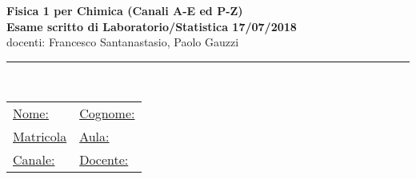 \documentclass[10pt,a4paper,fleqn]{article}
\begin{document}
\pagestyle{empty}

%
%
\newsavebox{\savepar}
\newenvironment{boxit}{\begin{lrbox}{\savepar}
\begin{minipage}[b]{16.0cm}}
{\end{minipage}\end{lrbox}\fbox{\usebox{\savepar}}}
\newcommand{\myblist}[1]{\begin{list}{#1}{\setlength{\topsep}{1.8mm}
\setlength{\parskip}{0mm} \setlength{\partopsep}{0mm} \setlength{\parsep}{0mm}
\setlength{\itemsep}{0mm}}}
\newcommand{\myhfill}[1]{\hfill {\it #1} = \underline{$~~~~~~~~~~~~~~~~~~~~~~~~~~~$}}
\newcommand{\myhfiyn}[0]{\hfill $\Box$~{\sc si}~~~~~~~~$\Box$~{\sc no}}
\newcommand{\myhfild}[2]
{\hfill {\it #1}= \underline{$~~~~~~~~~~$};~ {\it #2}= \underline{$~~~~~~~~~~$}}
\newcommand{\myhfilt}[3]
{\hfill {\it #1}= \underline{$~~~~~~~~~~~~~$};~ 
{\it #2}= \underline{$~~~~~~~~~~~~~$};~{\it #3}= \underline{$~~~~~~~~~~~~~$}}
%

\setlength{\unitlength}{1mm} 
\setlength{\headheight}{0mm} %

\newcommand{\s}{\text{s}}
\newcommand{\km}{\text{km}}
\newcommand{\kg}{\text{kg}}


\vspace*{-3.5cm}
\Large
{
\begin{center}
\vspace{0.1cm}
{\bf  Fisica 1 per Chimica (Canali A-E ed P-Z)} \\
{\bf Esame scritto di Laboratorio/Statistica 17/07/2018}   \\
docenti: Francesco Santanastasio, Paolo Gauzzi
   \\
\end{center}
\noindent\rule{18cm}{0.4pt}  \\
\normalsize
%
\begin{tabular}{ll}
{\underline{Nome:}}  \hspace{6cm} & {\underline{Cognome:}} \\[0.35cm]
{\underline {Matricola}} & {\underline {Aula:}}  \\[0.35cm]
{\underline {Canale:}} & {\underline {Docente:}}
\end{tabular}
\vspace{0.5cm}
}
\small
\end{document}
